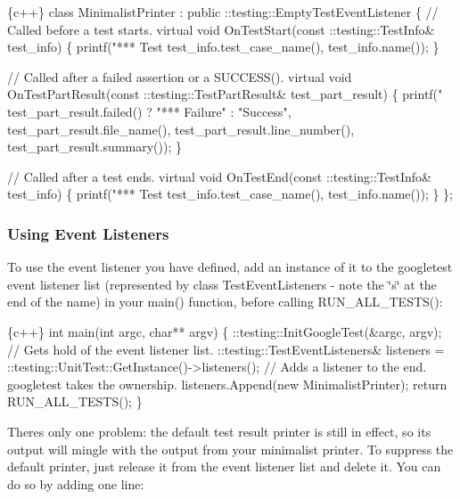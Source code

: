 \begin{DoxyCode}
\{c++\}
  class MinimalistPrinter : public ::testing::EmptyTestEventListener \{
    // Called before a test starts.
    virtual void OnTestStart(const ::testing::TestInfo& test\_info) \{
      printf("*** Test %
             test\_info.test\_case\_name(), test\_info.name());
    \}

    // Called after a failed assertion or a SUCCESS().
    virtual void OnTestPartResult(const ::testing::TestPartResult& test\_part\_result) \{
      printf("%
             test\_part\_result.failed() ? "*** Failure" : "Success",
             test\_part\_result.file\_name(),
             test\_part\_result.line\_number(),
             test\_part\_result.summary());
    \}

    // Called after a test ends.
    virtual void OnTestEnd(const ::testing::TestInfo& test\_info) \{
      printf("*** Test %
             test\_info.test\_case\_name(), test\_info.name());
    \}
  \};
\end{DoxyCode}


\subsubsection*{Using Event Listeners}

To use the event listener you have defined, add an instance of it to the googletest event listener list (represented by class Test\+Event\+Listeners -\/ note the \char`\"{}s\char`\"{} at the end of the name) in your {\ttfamily main()} function, before calling {\ttfamily R\+U\+N\+\_\+\+A\+L\+L\+\_\+\+T\+E\+S\+T\+S()}\+:


\begin{DoxyCode}
\{c++\}
int main(int argc, char** argv) \{
  ::testing::InitGoogleTest(&argc, argv);
  // Gets hold of the event listener list.
  ::testing::TestEventListeners& listeners =
        ::testing::UnitTest::GetInstance()->listeners();
  // Adds a listener to the end.  googletest takes the ownership.
  listeners.Append(new MinimalistPrinter);
  return RUN\_ALL\_TESTS();
\}
\end{DoxyCode}


There\textquotesingle{}s only one problem\+: the default test result printer is still in effect, so its output will mingle with the output from your minimalist printer. To suppress the default printer, just release it from the event listener list and delete it. You can do so by adding one line\+:


